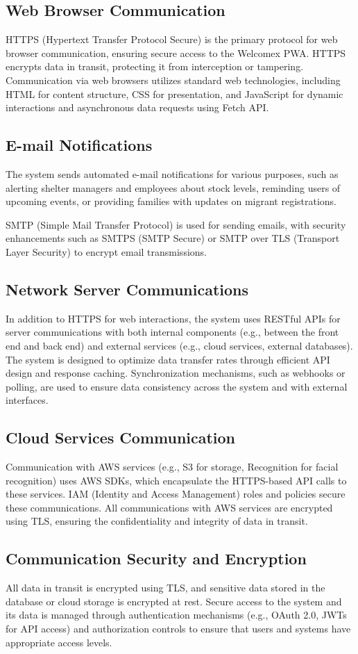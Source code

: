 \documentclass{scrreprt}
\begin{document}
\subsection*{Web Browser Communication}
HTTPS (Hypertext Transfer Protocol Secure) is the primary protocol for web browser communication, ensuring secure access to the Welcomex PWA. HTTPS encrypts data in transit, protecting it from interception or tampering. Communication via web browsers utilizes standard web technologies, including HTML for content structure, CSS for presentation, and JavaScript for dynamic interactions and asynchronous data requests using Fetch API.
\subsection*{E-mail Notifications}
The system sends automated e-mail notifications for various purposes, such as alerting shelter managers and employees about stock levels, reminding users of upcoming events, or providing families with updates on migrant registrations.

SMTP (Simple Mail Transfer Protocol) is used for sending emails, with security enhancements such as SMTPS (SMTP Secure) or SMTP over TLS (Transport Layer Security) to encrypt email transmissions.
\subsection*{Network Server Communications}
In addition to HTTPS for web interactions, the system uses RESTful APIs for server communications with both internal components (e.g., between the front end and back end) and external services (e.g., cloud services, external databases). The system is designed to optimize data transfer rates through efficient API design and response caching. Synchronization mechanisms, such as webhooks or polling, are used to ensure data consistency across the system and with external interfaces.
\subsection*{Cloud Services Communication}
Communication with AWS services (e.g., S3 for storage, Recognition for facial recognition) uses AWS SDKs, which encapsulate the HTTPS-based API calls to these services. IAM (Identity and Access Management) roles and policies secure these communications. All communications with AWS services are encrypted using TLS, ensuring the confidentiality and integrity of data in transit.
\subsection*{Communication Security and Encryption}
All data in transit is encrypted using TLS, and sensitive data stored in the database or cloud storage is encrypted at rest. Secure access to the system and its data is managed through authentication mechanisms (e.g., OAuth 2.0, JWTs for API access) and authorization controls to ensure that users and systems have appropriate access levels.
\end{document}
